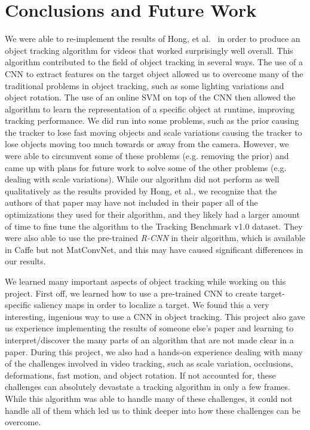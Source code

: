\documentclass{sig-alternate-05-2015}
\begin{document}
\section{Conclusions and Future Work}
We were able to re-implement the results of Hong, et al.~\cite{hong2015online} in order to produce an object tracking algorithm for videos that worked surprisingly well overall.
This algorithm contributed to the field of object tracking in several ways.
The use of a CNN to extract features on the target object allowed us to overcome many of the traditional problems in object tracking, such as some lighting variations and object rotation.
The use of an online SVM on top of the CNN then allowed the algorithm to learn the representation of a specific object at runtime, improving tracking performance. 
We did run into some problems, such as the prior causing the tracker to lose fast moving objects and scale variations causing the tracker to lose objects moving too much towards or away from the camera.
However, we were able to circumvent some of these problems (e.g. removing the prior) and came up with plans for future work to solve some of the other problems (e.g. dealing with scale variations).
While our algorithm did not perform as well qualitatively as the results provided by Hong, et al., we recognize that the authors of that paper may have not included in their paper all of the optimizations they used for their algorithm, and they likely had a larger amount of time to fine tune the algorithm to the Tracking Benchmark v1.0 dataset.
They were also able to use the pre-trained \textit{R-CNN} in their algorithm, which is available in Caffe but not MatConvNet, and this may have caused significant differences in our results.

We learned many important aspects of object tracking while working on this project.
First off, we learned how to use a pre-trained CNN to create target-specific saliency maps in order to localize a target.
We found this a very interesting, ingenious way to use a CNN in object tracking.
This project also gave us experience implementing the results of someone else's paper and learning to interpret/discover the many parts of an algorithm that are not made clear in a paper.
During this project, we also had a hands-on experience dealing with many of the challenges involved in video tracking, such as scale variation, occlusions, deformations, fast motion, and object rotation.
If not accounted for, these challenges can absolutely devastate a tracking algorithm in only a few frames.
While this algorithm was able to handle many of these challenges, it could not handle all of them which led us to think deeper into how these challenges can be overcome.
\end{document}
